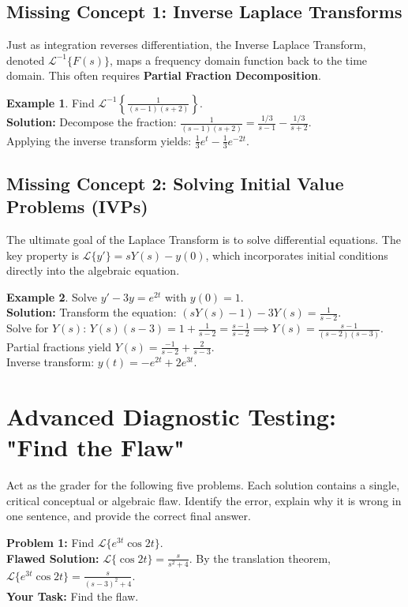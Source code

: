 \documentclass[11pt, a4paper]{article}
\theoremstyle{definition}
\newtheorem{example}{Example}[section]
\theoremstyle{remark}
\begin{document}
\subsection{Missing Concept 1: Inverse Laplace Transforms}
Just as integration reverses differentiation, the Inverse Laplace Transform, denoted $\mathscr{L}^{-1}\{F(s)\}$, maps a frequency domain function back to the time domain. This often requires \textbf{Partial Fraction Decomposition}.
\begin{example}
Find $\mathscr{L}^{-1} \left\{ \frac{1}{(s-1)(s+2)} \right\}$. \\
\textbf{Solution:} Decompose the fraction: $\frac{1}{(s-1)(s+2)} = \frac{1/3}{s-1} - \frac{1/3}{s+2}$. \\
Applying the inverse transform yields: $\frac{1}{3}e^t - \frac{1}{3}e^{-2t}$.
\end{example}

\subsection{Missing Concept 2: Solving Initial Value Problems (IVPs)}
The ultimate goal of the Laplace Transform is to solve differential equations. The key property is $\mathscr{L}\{y'\} = sY(s) - y(0)$, which incorporates initial conditions directly into the algebraic equation.
\begin{example}
Solve $y' - 3y = e^{2t}$ with $y(0) = 1$. \\
\textbf{Solution:} Transform the equation: $(sY(s) - 1) - 3Y(s) = \frac{1}{s-2}$. \\
Solve for $Y(s)$: $Y(s)(s-3) = 1 + \frac{1}{s-2} = \frac{s-1}{s-2} \implies Y(s) = \frac{s-1}{(s-2)(s-3)}$. \\
Partial fractions yield $Y(s) = \frac{-1}{s-2} + \frac{2}{s-3}$. \\
Inverse transform: $y(t) = -e^{2t} + 2e^{3t}$.
\end{example}

\section{Advanced Diagnostic Testing: "Find the Flaw"}
Act as the grader for the following five problems. Each solution contains a single, critical conceptual or algebraic flaw. Identify the error, explain why it is wrong in one sentence, and provide the correct final answer.

\vspace{10pt}
\noindent\textbf{Problem 1:} Find $\mathscr{L}\{e^{3t} \cos 2t\}$. \\
\textbf{Flawed Solution:} $\mathscr{L}\{\cos 2t\} = \frac{s}{s^2+4}$. By the translation theorem, $\mathscr{L}\{e^{3t} \cos 2t\} = \frac{s}{(s-3)^2 + 4}$. \\
\textbf{Your Task:} Find the flaw.
\vspace{10pt}
\end{document}
